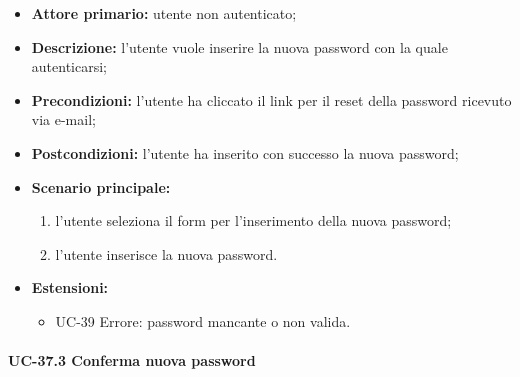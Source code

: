 	\begin{itemize}
		\item \textbf{Attore primario:} utente non autenticato;

		\item \textbf{Descrizione:} l'utente vuole inserire la nuova password con la quale autenticarsi;

		\item \textbf{Precondizioni:} l'utente ha cliccato il link per il reset della password ricevuto via e-mail;

		\item \textbf{Postcondizioni:} l'utente ha inserito con successo la nuova password;

		\item \textbf{Scenario principale:}
	  		\begin{enumerate}
		  		\item l'utente seleziona il form per l'inserimento della nuova password;
		  		\item l'utente inserisce la nuova password.
	  		\end{enumerate}
	  	\item \textbf{Estensioni:}
	  		\begin{itemize}
		  		\item UC-39 Errore: password mancante o non valida.
	  		\end{itemize}
	\end{itemize}

\paragraph{UC-37.3 Conferma nuova password}

